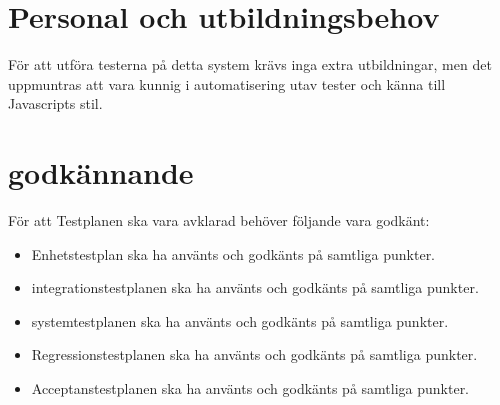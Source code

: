\documentclass[10pt]{article}
\begin{document}
\section{Personal och utbildningsbehov}
	För att utföra testerna på detta system krävs inga extra utbildningar, men det uppmuntras att vara kunnig i automatisering utav tester och känna till Javascripts stil.

	
	
\section{godkännande}
	För att Testplanen ska vara avklarad behöver följande vara godkänt:
	\begin{itemize}
	 \item Enhetstestplan ska ha använts och godkänts på samtliga punkter.
	 \item integrationstestplanen ska ha använts och godkänts på samtliga punkter.
	 \item systemtestplanen ska ha använts och godkänts på samtliga punkter.
	 \item Regressionstestplanen ska ha använts och godkänts på samtliga punkter.
	 \item Acceptanstestplanen ska ha använts och godkänts på samtliga punkter.
	\end{itemize}
	
\end{document}
